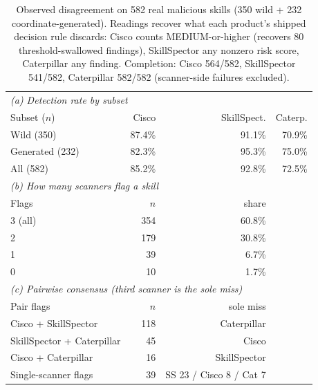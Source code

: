\documentclass[sigconf,nonacm]{acmart}
\begin{document}
\begin{table}[t]
\caption{Observed disagreement on 582 real malicious skills (350 wild + 232 coordinate-generated). Readings recover what each product's shipped decision rule discards: Cisco counts MEDIUM-or-higher (recovers 80 threshold-swallowed findings), SkillSpector any nonzero risk score, Caterpillar any finding. Completion: Cisco 564/582, SkillSpector 541/582, Caterpillar 582/582 (scanner-side failures excluded).}
\label{tab:disagg}
\small
\begin{tabular}{@{}lrrr@{}}
\toprule
\multicolumn{4}{l}{\emph{(a) Detection rate by subset}} \\
Subset ($n$) & Cisco & SkillSpect. & Caterp. \\
\midrule
Wild (350) & 87.4\% & 91.1\% & 70.9\% \\
Generated (232) & 82.3\% & 95.3\% & 75.0\% \\
All (582) & 85.2\% & 92.8\% & 72.5\% \\
\midrule
\multicolumn{4}{l}{\emph{(b) How many scanners flag a skill}} \\
Flags & $n$ & share & \\
\midrule
3 (all) & 354 & 60.8\% & \\
2 & 179 & 30.8\% & \\
1 & 39 & 6.7\% & \\
0 & 10 & 1.7\% & \\
\midrule
\multicolumn{4}{l}{\emph{(c) Pairwise consensus (third scanner is the sole miss)}} \\
Pair flags & $n$ & sole miss & \\
\midrule
Cisco + SkillSpector & 118 & Caterpillar & \\
SkillSpector + Caterpillar & 45 & Cisco & \\
Cisco + Caterpillar & 16 & SkillSpector & \\
Single-scanner flags & 39 & SS 23 / Cisco 8 / Cat 7 & \\
\bottomrule
\end{tabular}
\end{table}
\end{document}
